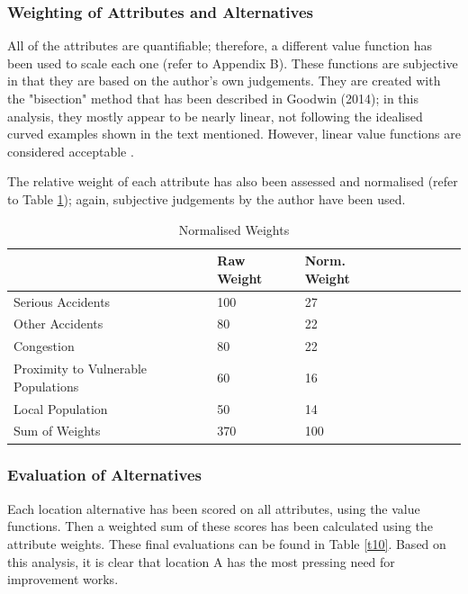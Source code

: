 \documentclass[11pt, a4paper]{article}
\begin{document}
    \subsubsection{Weighting of Attributes and Alternatives}

    All of the attributes are quantifiable; therefore, a different value function has been used to scale each one (refer to Appendix B). These functions are subjective in that they are based on the author's own judgements. They are created with the "bisection" method that has been described in Goodwin (2014); in this analysis, they mostly appear to be nearly linear, not following the idealised curved examples shown in the text mentioned. However, linear value functions are considered acceptable \parencite{a6}.

    The relative weight of each attribute has also been assessed and normalised (refer to Table \ref{t9}); again, subjective judgements by the author have been used.

    \begin{table}[!ht]
        \centering
        \begin{tabular}{|l|l|l|l|l|l|l|l|}
        \hline
            ~ & Raw Weight & Norm. Weight       \\ \hline
            Serious Accidents & 100 & 27       \\ \hline
            Other Accidents & 80 & 22       \\ \hline
            Congestion & 80 & 22       \\ \hline
            Proximity to Vulnerable Populations & 60 & 16       \\ \hline
            Local Population & 50 & 14       \\ \hline
            Sum of Weights & 370 & 100       \\ \hline
        \end{tabular}
        \caption{Normalised Weights}
        \label{t9}
    \end{table}

    \subsubsection{Evaluation of Alternatives}

    Each location alternative has been scored on all attributes, using the value functions. Then a weighted sum of these scores has been calculated using the attribute weights. These final evaluations can be found in Table \ref{t10}. Based on this analysis, it is clear that location A has the most pressing need for improvement works.
\end{document}
